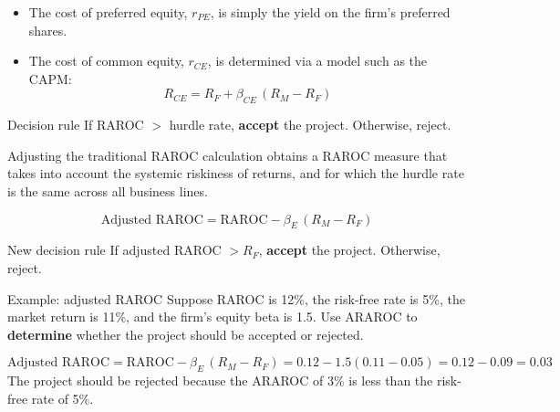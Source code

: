 \begin{itemize}
\item The cost of preferred equity, $r_{PE}$, is simply the yield on the firm's
preferred shares.
\item The cost of common equity, $r_{CE}$, is determined via a model such as the
CAPM:
\[
R_{CE}=R_{F}+\beta_{CE}\,(R_{M}-R_{F})
\]
\end{itemize}

\begin{orexambox}{Decision rule}
If RAROC $>$ hurdle rate, \textbf{accept} the project. Otherwise, reject.
\end{orexambox}



Adjusting the traditional RAROC calculation obtains a RAROC measure that takes into
account the systemic riskiness of returns, and for which the hurdle rate is the
same across all business lines.

\begin{orkeybox}
\[
\text{Adjusted RAROC} = \mathrm{RAROC} - \beta_{E}\,(R_{M}-R_{F})
\]
\end{orkeybox}

\begin{orexambox}{New decision rule}
If adjusted RAROC $> R_{F}$, \textbf{accept} the project. Otherwise, reject.
\end{orexambox}

\begin{orexambox}{Example: adjusted RAROC}
Suppose RAROC is 12\%, the risk-free rate is 5\%, the market return is 11\%, and
the firm's equity beta is 1.5. Use ARAROC to \textbf{determine} whether the
project should be accepted or rejected.

\vspace{7pt}
\par
\vspace{3pt}
\[
\text{Adjusted RAROC} = \mathrm{RAROC} - \beta_{E}\,(R_{M}-R_{F})
= 0.12 - 1.5(0.11-0.05) = 0.12-0.09 = 0.03
\]
The project should be rejected because the ARAROC of 3\% is less than the
risk-free rate of 5\%.
\end{orexambox}


